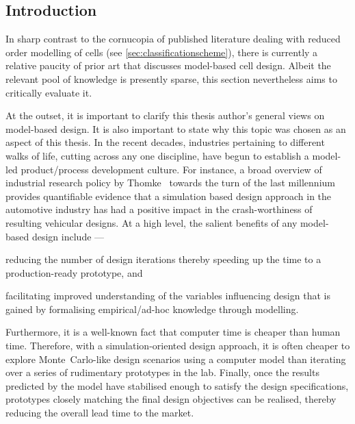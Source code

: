 


\subsection{Introduction}

In  sharp  contrast to  the  cornucopia  of  published literature  dealing  with
reduced order modelling of cells (see \cref{sec:classificationscheme}), there is
currently  a relative  paucity  of  prior art  that  discusses model-based  cell
design. Albeit the relevant pool of  knowledge is presently sparse, this section
nevertheless aims to critically evaluate it.

At the outset, it is important to  clarify this thesis author's general views on
model-based design. It is  also important to state why this  topic was chosen as
an  aspect of  this  thesis. In  the recent  decades,  industries pertaining  to
different  walks of  life,  cutting across  any one  discipline,  have begun  to
establish a model-led product/process development culture. For instance, a broad
overview of  industrial research policy by  Thomke~\cite{Thomke1998} towards the
turn of  the last  millennium provides quantifiable  evidence that  a simulation
based design  approach in the automotive  industry has had a  positive impact in
the  crash-worthiness of  resulting  vehicular  designs. At  a  high level,  the
salient benefits of any model-based design include ---
\begin{enumerate*}[label=\itshape\alph*\upshape)]
    \item reducing the number of design iterations thereby speeding up the time to a production-ready prototype, and
    \item facilitating improved understanding of the variables influencing design that is gained by formalising empirical/ad-hoc knowledge through modelling.
\end{enumerate*}
Furthermore, it  is a well-known fact  that computer time is cheaper  than human
time. Therefore, with a simulation-oriented design approach, it is often cheaper
to  explore  Monte~Carlo-like  design  scenarios using  a  computer  model  than
iterating over a series of rudimentary  prototypes in the lab. Finally, once the
results predicted  by the  model have  stabilised enough  to satisfy  the design
specifications, prototypes closely  matching the final design  objectives can be
realised, thereby reducing the overall lead time to the market.


